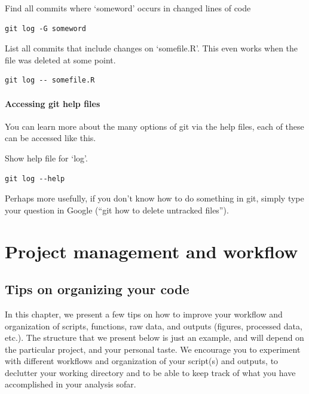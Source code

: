 \documentclass[]{book}
\begin{document}
Find all commits where `someword' occurs in changed lines of code

\begin{verbatim}
git log -G someword
\end{verbatim}

List all commits that include changes on `somefile.R'. This even works when the file was deleted at some point.

\begin{verbatim}
git log -- somefile.R
\end{verbatim}

\hypertarget{accessing-git-help-files}{%
\subsubsection{Accessing git help files}\label{accessing-git-help-files}}

You can learn more about the many options of git via the help files, each of these can be accessed like this.

Show help file for `log'.

\begin{verbatim}
git log --help
\end{verbatim}

Perhaps more usefully, if you don't know how to do something in git, simply type your question in Google (``git how to delete untracked files'').

\hypertarget{projectman}{%
\chapter{Project management and workflow}\label{projectman}}

\hypertarget{tips-on-organizing-your-code}{%
\section{Tips on organizing your code}\label{tips-on-organizing-your-code}}

In this chapter, we present a few tips on how to improve your workflow and organization of scripts, functions, raw data, and outputs (figures, processed data, etc.). The structure that we present below is just an example, and will depend on the particular project, and your personal taste. We encourage you to experiment with different workflows and organization of your script(s) and outputs, to declutter your working directory and to be able to keep track of what you have accomplished in your analysis sofar.
\end{document}
